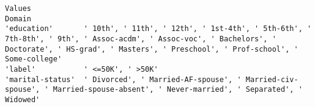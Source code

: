\documentclass[11pt]{article}
\begin{document}
    \begin{Verbatim}[commandchars=\\\{\}]
                                                                                                                                                                                                                                                                                                                                                                                                                                                                                                                                                                           Values
Domain                                                                                                                                                                                                                                                                                                                                                                                                                                                                                                                                                                           
'education'       ' 10th', ' 11th', ' 12th', ' 1st-4th', ' 5th-6th', ' 7th-8th', ' 9th', ' Assoc-acdm', ' Assoc-voc', ' Bachelors', ' Doctorate', ' HS-grad', ' Masters', ' Preschool', ' Prof-school', ' Some-college'                                                                                                                                                                                                                                                                                                                                                          
'label'           ' <=50K', ' >50K'                                                                                                                                                                                                                                                                                                                                                                                                                                                                                                                                              
'marital-status'  ' Divorced', ' Married-AF-spouse', ' Married-civ-spouse', ' Married-spouse-absent', ' Never-married', ' Separated', ' Widowed'                                                                                                                                                                                                                                                                                                                                                                                                                                 

\end{Verbatim}
\end{document}
